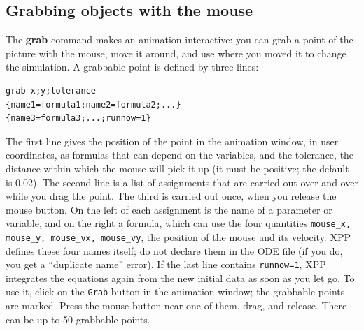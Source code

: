 \documentclass{article}
\begin{document}
\subsection{Grabbing objects with the mouse}
The {\bf grab} command makes an animation interactive: you can grab a point of the picture with the mouse, move it
around, and use where you moved it to change the simulation.  A grabbable point is defined by three lines:
\begin{verbatim}
grab x;y;tolerance
{name1=formula1;name2=formula2;...}
{name3=formula3;...;runnow=1}
\end{verbatim}
The first line gives the position of the point in the animation window, in user coordinates, as formulas that can depend on the
variables, and the tolerance, the distance within which the mouse will pick it up (it must be positive; the default is 0.02).
The second line is a list of assignments that are carried out over and over while you drag the point.  The third is
carried out once, when you release the mouse button.  On the left of each assignment is the name of a parameter or variable, and
on the right a formula, which can use the four quantities {\tt mouse\_x, mouse\_y, mouse\_vx, mouse\_vy}, the position of the mouse and its
velocity.  XPP defines these four names itself; do not declare them in the ODE file (if you do, you get a ``duplicate name'' error).  If the
last line contains {\tt runnow=1}, XPP integrates the equations again from the new initial data as soon as you let go.
To use it, click on the {\tt Grab} button in the animation window; the grabbable points are marked.  Press the mouse
button near one of them, drag, and release.  There can be up to 50 grabbable points.
\end{document}
